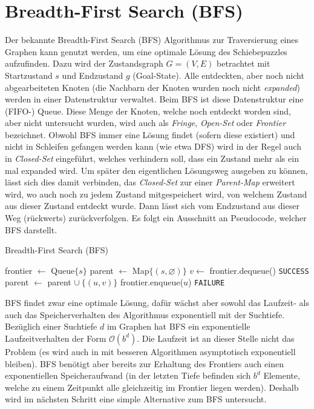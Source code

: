 \documentclass{whswinvcbook}
\begin{document}
\section{Breadth-First Search (BFS)}
Der bekannte Breadth-First Search (BFS) Algorithmus zur Traversierung eines Graphen kann genutzt werden, um eine optimale Lösung des Schiebepuzzles aufzufinden. Dazu wird der Zustandsgraph $G=(V,E)$ betrachtet mit Startzustand $s$ und Endzustand $g$ (Goal-State). Alle entdeckten, aber noch nicht abgearbeiteten Knoten (die Nachbarn der Knoten wurden noch nicht \textit{expanded}) werden in einer Datenstruktur verwaltet. Beim BFS ist diese Datenstruktur eine (FIFO-) Queue. Diese Menge der Knoten, welche noch entdeckt worden sind, aber nicht untersucht wurden, wird auch als \textit{Fringe}, \textit{Open-Set} oder \textit{Frontier} bezeichnet. Obwohl BFS immer eine Lösung findet (sofern diese existiert) und nicht in Schleifen gefangen werden kann (wie etwa DFS) wird in der Regel auch in \textit{Closed-Set} eingeführt, welches verhindern soll, dass ein Zustand mehr als ein mal expanded wird. Um später den eigentlichen Lösungsweg ausgeben zu können, lässt sich dies damit verbinden, das \textit{Closed-Set} zur einer \textit{Parent-Map} erweitert wird, wo auch noch zu jedem Zustand mitgespeichert wird, von welchem Zustand aus dieser Zustand entdeckt wurde. Dann lässt sich vom Endzustand aus dieser Weg (rückwerts) zurückverfolgen. Es folgt ein Ausschnitt an Pseudocode, welcher BFS darstellt.
\begin{algorithm}[H]
    \caption{Breadth-First Search (BFS)}\label{alg-bfs}
    \begin{algorithmic}[1]
            \State frontier $\gets$ Queue$\{s\}$
            \State parent $\gets$ Map$\{(s,\varnothing)\}$
            \Repeat
                \State $v\gets$ frontier.dequeue()
                    \State \Return \texttt{SUCCESS}
                \EndIf
                        \State parent $\gets$ parent $\cup\:\{(u,v)\}$
                        \State frontier.enqueue($u$)
                    \EndIf
                \EndFor
            \State \Return \texttt{FAILURE}
        \EndFunction
    \end{algorithmic}
\end{algorithm}
BFS findet zwar eine optimale Lösung, dafür wächst aber sowohl das Laufzeit- als auch das Speicherverhalten des Algorithmus exponentiell mit der Suchtiefe. Bezüglich einer Suchtiefe $d$ im Graphen hat BFS ein exponentielle Laufzeitverhalten der Form $\mathcal{O}(b^d)$. Die Laufzeit ist an dieser Stelle nicht das Problem (es wird auch in mit besseren Algorithmen asymptotisch exponentiell bleiben). BFS benötigt aber bereits zur Erhaltung des Frontiers auch einen exponentiellen Speicheraufwand (in der letzten Tiefe befinden sich $b^d$ Elemente, welche zu einem Zeitpunkt alle gleichzeitig im Frontier liegen werden). Deshalb wird im nächsten Schritt eine simple Alternative zum BFS untersucht.
\end{document}

